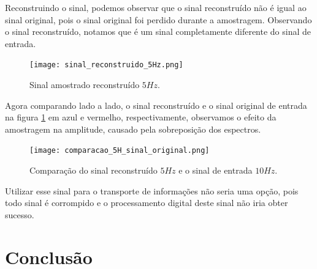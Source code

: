\documentclass[]{IEEEtran}
\begin{document}
Reconstruindo o sinal, podemos observar que o sinal reconstruído não é igual ao sinal original, pois o sinal original foi perdido durante a amostragem. Observando o sinal reconstruído, notamos que é um sinal completamente diferente do sinal de entrada.

\begin{figure}[H]
\captionsetup{justification=centering}
\centering %
\texttt{[image: sinal\_reconstruido\_5Hz.png]} %
\caption{Sinal amostrado reconstruído $5Hz$.}
\end{figure}

Agora comparando lado a lado, o sinal reconstruído e o sinal original de entrada na figura \ref{fig:comparacao_5H_sinal_original} em azul e vermelho, respectivamente, observamos o efeito da amostragem na amplitude, causado pela sobreposição dos espectros.

\begin{figure}[H]
\captionsetup{justification=centering}
\centering %
\texttt{[image: comparacao\_5H\_sinal\_original.png]} %
\label{fig:comparacao_5H_sinal_original}
\caption{Comparação do sinal reconstruído $5Hz$ e o sinal de entrada $10Hz$.}
\end{figure}

Utilizar esse sinal para o transporte de informações não seria uma opção, pois todo sinal é corrompido e o processamento digital deste sinal não iria obter sucesso.

\section{Conclusão}


%
%
%


\end{document}
